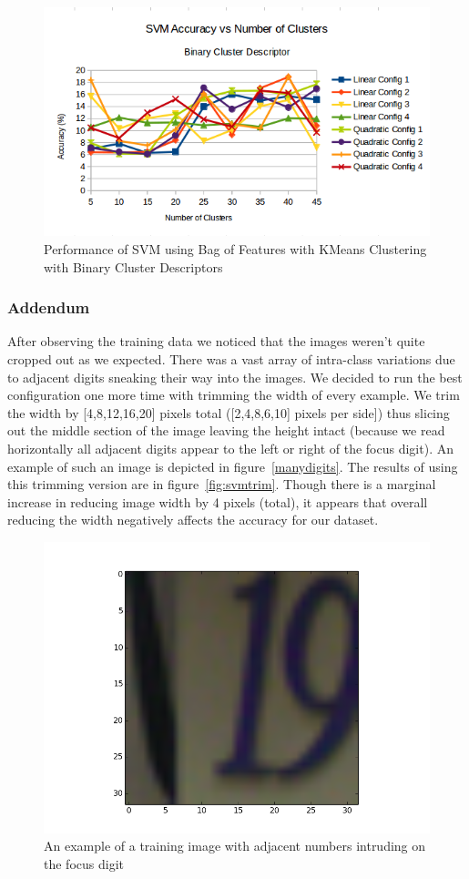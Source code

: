 \documentclass{article} %
\begin{document}
\begin{figure}
\centering
	\includegraphics[width=0.8\linewidth]{./plots/svm/clusterbinary}
    	\caption{Performance of SVM using Bag of Features with KMeans Clustering with Binary Cluster Descriptors}
	\label{fig:clusterbinary}
\end{figure}

\subsubsection{Addendum}
After observing the training data we noticed that the images weren't quite cropped out as we expected.  There was a vast array of intra-class variations due to adjacent digits sneaking their way into the images.  We decided to run the best configuration one more time with trimming the width of every example.  We trim the width by [4,8,12,16,20] pixels total ([2,4,8,6,10] pixels per side]) thus slicing out the middle section of the image leaving the height intact (because we read horizontally all adjacent digits appear to the left or right of the focus digit).  An example of such an image is depicted in figure~\ref{manydigits}.  The results of using this trimming version are in figure~\ref{fig:svmtrim}. Though there is a marginal increase in reducing image width by 4 pixels (total), it appears that overall reducing the width negatively affects the accuracy for our dataset.

\begin{figure}
\centering
	\includegraphics[width=0.8\linewidth]{./plots/manydigits}
    	\caption{An example of a training image with adjacent numbers intruding on the focus digit}
	\label{fig:manydigits}
\end{figure}
\end{document}
